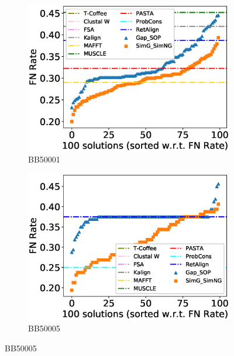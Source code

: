 \begin{figure}[!htbp]
	
	\begin{adjustwidth}{-1.5cm}{-1cm}
		\centering
		\begin{subfigure}{0.22\textwidth}
			\includegraphics[width=\columnwidth]{Figure/summary/precomputedInit/Balibase/BB50001_fnrate_density_single_run}
			\caption{BB50001}
		\end{subfigure}	
		\begin{subfigure}{0.22\textwidth}
			\includegraphics[width=\columnwidth]{Figure/summary/precomputedInit/Balibase/BB50005_fnrate_density_single_run}
			\caption{BB50005}
		\end{subfigure}

\end{adjustwidth}
\end{figure}
